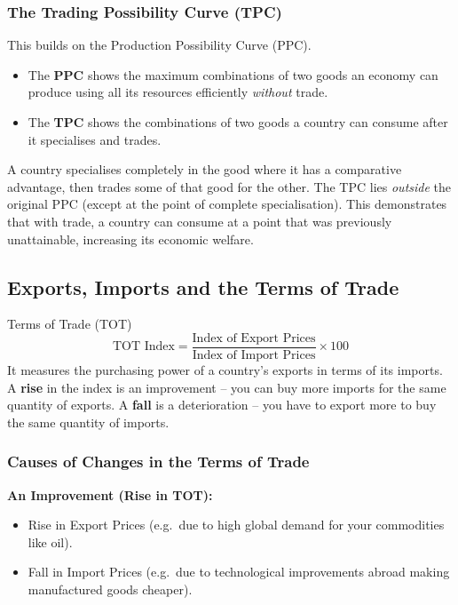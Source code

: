 \documentclass[11pt, a4paper, twoside]{book}
\begin{document}
\subsubsection{The Trading Possibility Curve (TPC)}

This builds on the Production Possibility Curve (PPC).

\begin{itemize}
  \item The \textbf{PPC} shows the maximum combinations of two goods an economy can produce using all its resources efficiently \emph{without} trade.
  \item The \textbf{TPC} shows the combinations of two goods a country can consume after it specialises and trades.
\end{itemize}

A country specialises completely in the good where it has a comparative advantage, then trades some of that good for the other. The TPC lies \emph{outside} the original PPC (except at the point of complete specialisation). This demonstrates that with trade, a country can consume at a point that was previously unattainable, increasing its economic welfare.

\subsection{Exports, Imports and the Terms of Trade}

\begin{keyterm}{Terms of Trade (TOT)}
\[ \text{TOT Index} = \frac{\text{Index of Export Prices}}{\text{Index of Import Prices}} \times 100 \]
It measures the purchasing power of a country's exports in terms of its imports. A \textbf{rise} in the index is an improvement -- you can buy more imports for the same quantity of exports. A \textbf{fall} is a deterioration -- you have to export more to buy the same quantity of imports.
\end{keyterm}

\subsubsection{Causes of Changes in the Terms of Trade}

\textbf{An Improvement (Rise in TOT):}
\begin{itemize}
  \item Rise in Export Prices (e.g.\ due to high global demand for your commodities like oil).
  \item Fall in Import Prices (e.g.\ due to technological improvements abroad making manufactured goods cheaper).
\end{itemize}
\end{document}
